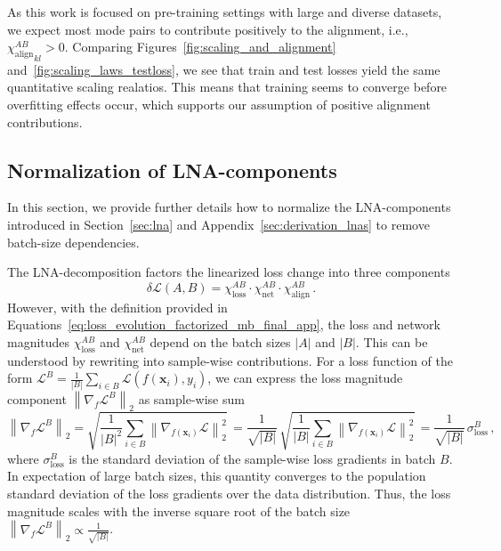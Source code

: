 As this work is focused on pre-training settings with large and diverse datasets, we expect most mode pairs to contribute positively to the alignment, i.e., \({\chi_{\text{align}}^{A B}}_{k l} > 0\). Comparing Figures~\ref{fig:scaling_and_alignment} and~\ref{fig:scaling_laws_testloss}, we see that train and test losses yield the same quantitative scaling realatios. This means that training seems to converge before overfitting effects occur, which supports our assumption of positive alignment contributions.

\subsection{Normalization of LNA-components}\label{sec:app_lna_normalization}
In this section, we provide further details how to normalize the LNA-components introduced in Section~\ref{sec:lna} and Appendix~\ref{sec:derivation_lnas} to remove batch-size dependencies.

The LNA-decomposition factors the linearized loss change into three components 
\begin{equation}
    \delta \mathcal{L}(A, B) 
    = \chi_{\text{loss}}^{A B} \cdot \chi_{\text{net}}^{A B} \cdot \chi_{\text{align}}^{A B} \, .
\end{equation}
However, with the definition provided in Equations~\ref{eq:loss_evolution_factorized_mb_final_app}, the loss and network magnitudes \(\chi_{\text{loss}}^{A B}\) and \(\chi_{\text{net}}^{A B}\) depend on the batch sizes \(|A|\) and \(|B|\). 
This can be understood by rewriting into sample-wise contributions. 
For a loss function of the form \(\mathcal{L}^B = \frac{1}{|B|} \sum_{i \in B} \mathcal{L}(f(\mathbf{x}_i), y_i)\), we can express the loss magnitude component \( \left\| \nabla_f \mathcal{L}^B \right\|_2 \) as sample-wise sum
\begin{equation}
    \left\| \nabla_f \mathcal{L}^B \right\|_2
    = \sqrt{ \frac{1}{|B|^2} \sum_{i \in B} \left\| \nabla_{f(\mathbf{x}_i)} \mathcal{L} \right\|_2^2 } \, 
    = \frac{1}{\sqrt{|B|}} \, \sqrt{ \frac{1}{|B|} \sum_{i \in B} \left\| \nabla_{f(\mathbf{x}_i)} \mathcal{L} \right\|_2^2 } \,
    = \frac{1}{\sqrt{|B|}} \, \sigma_{\text{loss}}^B \, ,
    \label{eq:loss_magnitude_batchsize_app}
\end{equation}
where \(\sigma_{\text{loss}}^B\) is the standard deviation of the sample-wise loss gradients in batch \(B\). In expectation of large batch sizes, this quantity converges to the population standard deviation of the loss gradients over the data distribution.
Thus, the loss magnitude scales with the inverse square root of the batch size \( \left\| \nabla_f \mathcal{L}^B \right\|_2 \propto \frac{1}{\sqrt{|B|}} \).

